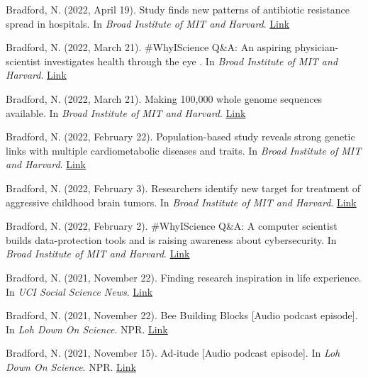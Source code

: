 \documentclass[margin, 10pt]{res} %
\begin{document}
\begin{resume}
Bradford, N. (2022, April 19). Study finds new patterns of antibiotic resistance spread in hospitals. In {\sl Broad Institute of MIT and Harvard}. \href{https://www.broadinstitute.org/news/study-finds-new-patterns-antibiotic-resistance-spread-hospitals}{Link}

Bradford, N. (2022, March 21). \#WhyIScience Q\&A: An aspiring physician-scientist investigates health through the eye
. In {\sl Broad Institute of MIT and Harvard}. \href{https://www.broadinstitute.org/blog/whyiscience-qa-aspiring-physician-scientist-investigates-health-through-eye}{Link}

Bradford, N. (2022, March 21). Making 100,000 whole genome sequences available. In {\sl Broad Institute of MIT and Harvard}. \href{https://www.broadinstitute.org/news/making-100000-whole-genome-sequences-available}{Link}


Bradford, N. (2022, February 22). Population-based study reveals strong genetic links with multiple cardiometabolic diseases and traits. In {\sl Broad Institute of MIT and Harvard}. \href{https://www.broadinstitute.org/news/population-based-study-reveals-strong-genetic-links-multiple-cardiometabolic-diseases-and-0}{Link}

Bradford, N. (2022, February 3). Researchers identify new target for treatment of aggressive childhood brain tumors. In {\sl Broad Institute of MIT and Harvard}. \href{https://www.broadinstitute.org/news/researchers-identify-new-target-treatment-aggressive-childhood-brain-tumors}{Link}

Bradford, N. (2022, February 2). \#WhyIScience Q\&A: A computer scientist builds data-protection tools and is raising awareness about cybersecurity. In {\sl Broad Institute of MIT and Harvard}. \href{https://www.broadinstitute.org/blog/whyiscience-qa-computer-scientist-builds-data-protection-tools-and-raising-awareness-about}{Link}

Bradford, N. (2021, November 22). Finding research inspiration in life experience. In {\sl UCI Social Science News}. \href{https://www.socsci.uci.edu/newsevents/news/2021/2021-11-22-zeinab-kachakeche.php}{Link}

Bradford, N. (2021, November 22). Bee Building Blocks [Audio podcast episode]. In {\sl Loh Down On Science}. NPR. \href{https://lohdownonscience.com/bee-building-blocks/}{Link}

Bradford, N. (2021, November 15). Ad-itude [Audio podcast episode]. In {\sl Loh Down On Science}. NPR. \href{https://lohdownonscience.com/ad-itude/}{Link}


\end{resume}
\end{document}
